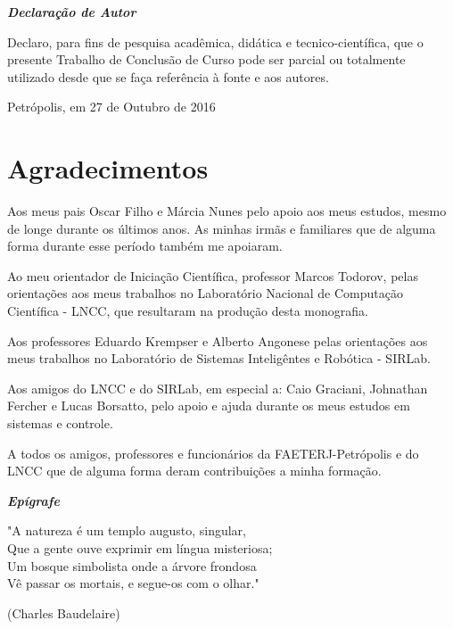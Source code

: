 \documentclass[brazil,ruledheader]{abntifes}
\newcommand{\AUTOR}{Oscar Neiva Eulálio Neto}
\newcommand{\DATA}{27 de Outubro de 2016}
\begin{document}
\newpage

\vfill 
\null
\begin{center}
{\Huge {\bfseries\itshape Declaração de Autor}}\\[3cm]
\begin{espacoduplo}
Declaro, para fins de pesquisa acadêmica, didática e tecnico-científica, que o presente Trabalho de Conclusão
de Curso pode ser parcial ou totalmente utilizado desde que se faça referência à fonte e aos autores.
\end{espacoduplo}
\setlength{\ABNTsignthickness}{0.4pt}
\assinatura{\AUTOR}
Petrópolis, em \DATA
\end{center}


\chapter*{Agradecimentos}
Aos meus pais Oscar Filho e Márcia Nunes pelo apoio aos meus estudos, mesmo de longe durante os últimos anos. As minhas irmãs e familiares que de alguma forma durante esse período também me apoiaram.

Ao meu orientador de Iniciação Científica, professor Marcos Todorov, pelas orientações aos meus trabalhos no Laboratório Nacional de Computação Científica - LNCC, que resultaram na produção desta monografia.

Aos professores Eduardo Krempser e Alberto Angonese pelas orientações aos meus trabalhos no Laboratório de Sistemas Inteligêntes e Robótica - SIRLab.

Aos amigos do LNCC e do SIRLab, em especial a: Caio Graciani, Johnathan Fercher e Lucas Borsatto, pelo apoio e ajuda durante os meus estudos em sistemas e controle.

A todos os amigos, professores e funcionários da FAETERJ-Petrópolis e do LNCC que de alguma forma deram contribuições a minha formação. 
\vfill 
\null

\vspace{10cm}
\begin{center}
{\Huge {\bfseries\itshape Epígrafe}}\\[3cm]
\vspace{10cm}
\end{center}



\epigraph{"A natureza é um templo augusto, singular,\\ 
		Que a gente ouve exprimir em língua misteriosa;\\
		Um bosque simbolista onde a árvore frondosa\\
		Vê passar os mortais, e segue-os com o olhar."}{(Charles Baudelaire)}
\end{document}

